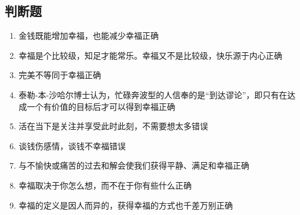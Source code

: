 \documentclass{article}
\begin{document}
	\subsection*{判断题}
	\begin{enumerate}
		\item 金钱既能增加幸福，也能减少幸福\hfill 正确
		
		\item 幸福是个比较级，知足才能常乐。幸福又不是比较级，快乐源于内心\hfill 正确
		
		\item 完美不等同于幸福\hfill 正确

		\item 泰勒-本-沙哈尔博士认为，忙碌奔波型的人信奉的是“到达谬论”，即只有在达成一个有价值的目标后才可以得到幸福\hfill 正确

		\item 活在当下是关注并享受此时此刻，不需要想太多\hfill 错误

		\item 谈钱伤感情，谈钱不幸福\hfill 错误

		\item 与不愉快或痛苦的过去和解会使我们获得平静、满足和幸福\hfill 正确

		\item 幸福取决于你怎么想，而不在于你有些什么\hfill 正确

		\item 幸福的定义是因人而异的，获得幸福的方式也千差万别\hfill 正确

	\end{enumerate}
\end{document}
